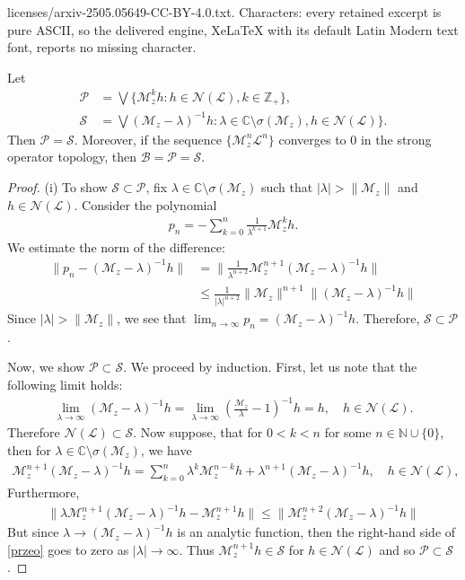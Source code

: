 \documentclass[10pt,a4paper]{amsart}
\newcommand*{\comp}{\mathbb{C}}
\newcommand*{\natu}{\mathbb{N}}
\newcommand*{\nul}{\mathscr{N}}
\newcommand*{\zbb}{\mathbb{Z}}
\newcommand{\bspace}{\mathcal{B}}
\newcommand{\lein}{\mathcal{L}}
\newcommand{\mul}{\mathcal{M}_z}
\begin{document}
licenses/arxiv-2505.05649-CC-BY-4.0.txt. Characters: every retained excerpt is pure ASCII, so the delivered engine, XeLaTeX with its default Latin Modern text font, reports no missing character.
\begin{lemma}\label{rpps}
Let 
\begin{align*}
    \mathcal{P}&=\bigvee\{\mul^kh\colon h\in \nul(\lein), k\in \zbb_+\}, \\\mathcal{S}&=\bigvee(\mul-\lambda)^{-1}h\colon \lambda\in \comp\setminus\sigma(\mul),  h\in \nul(\lein)\}.
\end{align*}
 Then $\mathcal{P}=\mathcal{S}$. Moreover, if the sequence $\{\mul^n\lein^n\}$ converges to $0$ in the strong operator topology, then $\bspace=\mathcal{P}=\mathcal{S}$.
\end{lemma}

\begin{proof}
 (i) To show $\mathcal{S}\subset\mathcal{P}$, fix $\lambda \in \comp\setminus\sigma(\mul)$ such that $|\lambda|>\|\mul\|$ and   $h\in \nul(\lein)$. Consider the polynomial 
    \begin{align*}
       p_n=-\sum_{k=0}^n \frac{1}{\lambda^{k+1}}\mul^kh.
    \end{align*}
We estimate the norm of the difference:
    \begin{align*}
        \|p_n-(\mul-\lambda)^{-1}h\|&=\|\frac{1}{\lambda^{n+2}}\mul^{n+1}(\mul-\lambda)^{-1}h\|
        \\&\leq \frac{1}{|\lambda|^{n+2}}\|\mul\|^{n+1}\|(\mul-\lambda)^{-1}h\|
    \end{align*}
    Since $|\lambda|>\|\mul\|$, we see that $\lim_{n\to \infty}p_n=(\mul-\lambda)^{-1}h$. Therefore, $\mathcal{S}\subset\mathcal{P}$.

    
 Now, we show $\mathcal{P}\subset\mathcal{S}$. We proceed by induction. First, let us note that the following limit holds:
\begin{align*}
  \lim_{\lambda\to \infty} (\mul-\lambda)^{-1}h = \lim_{\lambda \to \infty}(\frac{\mul}{\lambda}-1)^{-1}h= h,\quad h\in \nul(\lein).
\end{align*}
Therefore $\nul(\lein)\subset \mathcal{S}$.  Now suppose, that for $0<k<n$ for some $n \in \natu \cup \{0\}$, then for $\lambda \in \comp\setminus\sigma(\mul)$, we have
\begin{align*}
     \mul^{n+1}{(\mul-\lambda)^{-1}}h=\sum_{k=0}^n\lambda^{k}\mul^{n-k}h+\lambda^{n+1}{(\mul-\lambda)^{-1}}h,\quad h\in \nul(\lein), 
\end{align*}
 Furthermore,
\begin{align}\label{przeo}
    \| \lambda\mul^{n+1}{(\mul-\lambda)^{-1}}h-\mul^{n+1}h\|\leq  \| \mul^{n+2}{(\mul-\lambda)^{-1}}h\|
\end{align}
 But since $\lambda\to (\mul-\lambda)^{-1}h$ is an  analytic function, then
 the right-hand side of \eqref{przeo} goes to zero as $|\lambda|\to\infty$. Thus $\mul^{n+1}h\in \mathcal{S}$ for $h\in \nul(\lein)$ and so $\mathcal{P}\subset\mathcal{S}$.


\end{proof}
\end{document}
